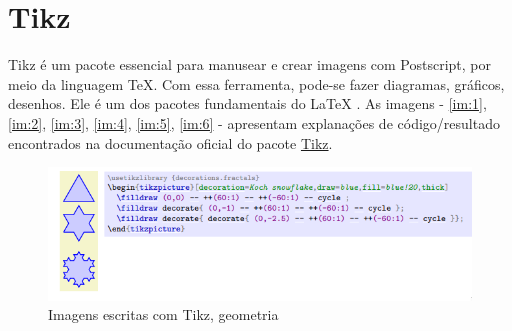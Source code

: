 \documentclass[
12pt,				%
openright,			%
oneside,			%
a4paper,			%
english,			%
french,				%
spanish,			%
brazil,				%
]{abntex2}
\begin{document}
\section{Tikz}

Tikz é um pacote essencial para manusear e crear imagens com
Postscript, por meio da linguagem \TeX. Com essa ferramenta, pode-se
fazer diagramas, gráficos, desenhos. Ele é um dos pacotes fundamentais
do \LaTeX{} \cite{lamport1994}. As imagens - \autoref{im:1}, \autoref{im:2},
\autoref{im:3}, \autoref{im:4}, \autoref{im:5}, \autoref{im:6}  - apresentam explanações de
código/resultado encontrados na documentação oficial do pacote \href{http://linorg.usp.br/CTAN/graphics/pgf/base/doc/pgfmanual.pdf}{Tikz}.

\begin{figure}[!htb]
  \caption{\label{im:1} Imagens escritas com Tikz, geometria}
  \begin{center}
    \includegraphics[width=\linewidth]{./Imagens/3.png}
  \end{center}
\end{figure}
\end{document}
